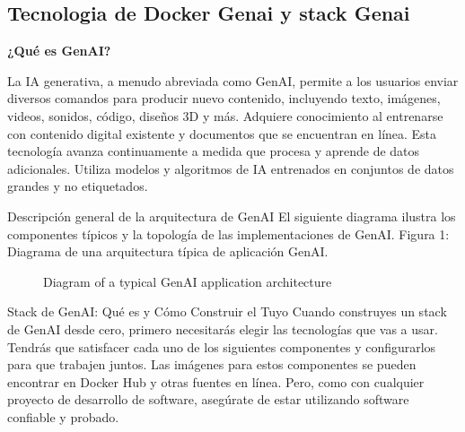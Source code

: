 \documentclass{article}
\begin{document}
\subsection{Tecnologia de Docker Genai y stack Genai}

\textbf{¿Qué es GenAI?}

La IA generativa, a menudo abreviada como GenAI, permite a los usuarios enviar diversos comandos para producir nuevo contenido, incluyendo texto, imágenes, videos, sonidos, código, diseños 3D y más. Adquiere conocimiento al entrenarse con contenido digital existente y documentos que se encuentran en línea. Esta tecnología avanza continuamente a medida que procesa y aprende de datos adicionales. Utiliza modelos y algoritmos de IA entrenados en conjuntos de datos grandes y no etiquetados.

Descripción general de la arquitectura de GenAI El siguiente diagrama ilustra los componentes típicos y la topología de las implementaciones de GenAI. Figura 1: Diagrama de una arquitectura típica de aplicación GenAI.

\begin{figure}[ht]
 \centering
 \caption{Diagram of a typical GenAI application architecture}
 \label{fig-1}
\end{figure}



Stack de GenAI: Qué es y Cómo Construir el Tuyo Cuando construyes un stack de GenAI desde cero, primero necesitarás elegir las tecnologías que vas a usar. Tendrás que satisfacer cada uno de los siguientes componentes y configurarlos para que trabajen juntos. Las imágenes para estos componentes se pueden encontrar en Docker Hub y otras fuentes en línea. Pero, como con cualquier proyecto de desarrollo de software, asegúrate de estar utilizando software confiable y probado.
\end{document}

